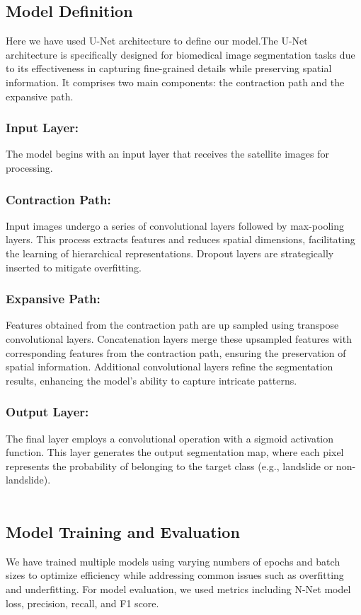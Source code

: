 \documentclass[12pt,a4paper]{report}
\begin{document}
    		\label{Model Definition}
		\subsection{Model Definition}Here we have used U-Net architecture \cite{ra_unet} to define our model.The U-Net architecture  is specifically designed for biomedical image segmentation tasks due to its effectiveness in capturing fine-grained details while preserving spatial information. It comprises two main components: the contraction path and the expansive path.
		\subsubsection{Input Layer: } The model begins with an input layer that receives the satellite images for processing.
		\subsubsection{Contraction Path:}  Input images undergo a series of convolutional layers followed by max-pooling layers. This process extracts features and reduces spatial dimensions, facilitating the learning of hierarchical representations. Dropout layers are strategically inserted to mitigate overfitting.
		\subsubsection{Expansive Path:} Features obtained from the contraction path are up sampled using transpose convolutional layers. Concatenation layers merge these upsampled features with corresponding features from the contraction path, ensuring the preservation of spatial information. Additional convolutional layers refine the segmentation results, enhancing the model's ability to capture intricate patterns.
		\subsubsection{Output Layer:} The final layer employs a convolutional operation with a sigmoid activation function. This layer generates the output segmentation map, where each pixel represents the probability of belonging to the target class (e.g., landslide or non-landslide).
	\\ \\

    		\label{Model Training and Evaluation}
		\subsection{Model Training and Evaluation}We have trained multiple models using varying numbers of epochs and batch sizes to optimize efficiency while addressing common issues such as overfitting and underfitting. For model evaluation, we used metrics including N-Net model loss, precision, recall, and F1 score. \cite{jys} \cite{f1}
	\\ \\
	
\end{document}

